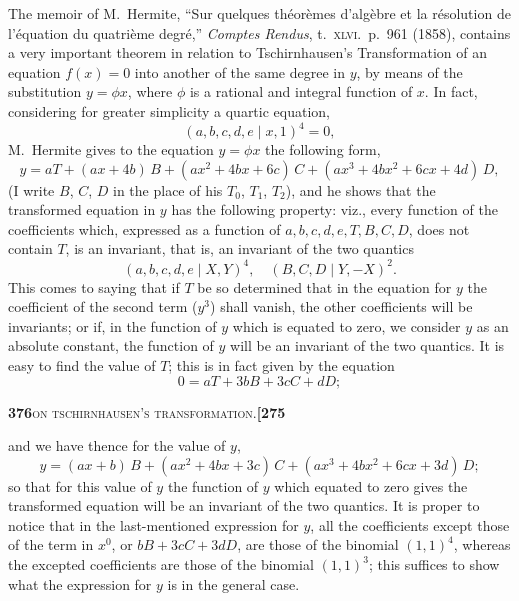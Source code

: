 \documentclass[11pt]{article}
\newcommand{\Cdel}{\mid}
\begin{document}
\noindent The memoir of M.~Hermite, ``Sur quelques th\'eor\`emes d'alg\`ebre et la r\'esolution de l'\'equation du quatri\`eme degr\'e,'' \textit{Comptes Rendus}, t.~\textsc{xlvi}.\ p.~961 (1858), contains a very important theorem in relation to Tschirnhausen's Transformation of an equation $f(x) = 0$ into another of the same degree in $y$, by means of the substitution $y = \phi x$, where $\phi$ is a rational and integral function of $x$. In fact, considering for greater simplicity a quartic equation,
\[
(a, b, c, d, e \Cdel x, 1)^4 = 0,
\]
M.~Hermite gives to the equation $y = \phi x$ the following form,
\[
y = a T + (a x + 4 b)\, B + (a x^2 + 4 b x + 6 c)\, C + (a x^3 + 4 b x^2 + 6 c x + 4 d)\, D,
\]
(I write $B$, $C$, $D$ in the place of his $T_0$, $T_1$, $T_2$), and he shows that the transformed equation in $y$ has the following property: viz., every function of the coefficients which, expressed as a function of $a, b, c, d, e, T, B, C, D$, does not contain $T$, is an invariant, that is, an invariant of the two quantics
\[
(a, b, c, d, e \Cdel X, Y)^4,\quad (B, C, D \Cdel Y, -X)^2.
\]
This comes to saying that if $T$ be so determined that in the equation for $y$ the coefficient of the second term ($y^3$) shall vanish, the other coefficients will be invariants; or if, in the function of $y$ which is equated to zero, we consider $y$ as an absolute constant, the function of $y$ will be an invariant of the two quantics. It is easy to find the value of $T$; this is in fact given by the equation
\[
0 = a T + 3 b B + 3 c C + d D;
\]

\newpage
\noindent\textbf{376}\hfill\textsc{on tschirnhausen's transformation.}\hfill\textbf{[275}

\medskip

\noindent and we have thence for the value of $y$,
\[
y = (a x + b)\, B + (a x^2 + 4 b x + 3 c)\, C + (a x^3 + 4 b x^2 + 6 c x + 3 d)\, D;
\]
so that for this value of $y$ the function of $y$ which equated to zero gives the transformed equation will be an invariant of the two quantics. It is proper to notice that in the last-mentioned expression for $y$, all the coefficients except those of the term in $x^0$, or $b B + 3 c C + 3 d D$, are those of the binomial $(1, 1)^4$, whereas the excepted coefficients are those of the binomial $(1, 1)^3$; this suffices to show what the expression for $y$ is in the general case.

\medskip
\end{document}
